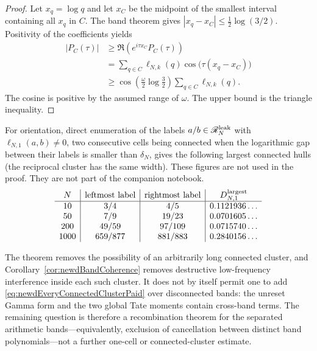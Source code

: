 \documentclass[11pt]{amsart}
\theoremstyle{definition}
\theoremstyle{remark}
\begin{document}
\begin{proof}
Let $x_q=\log q$ and let $x_C$ be the midpoint of the smallest interval
containing all $x_q$ in $C$.  The band theorem gives
$|x_q-x_C|\leq\tfrac12\log(3/2)$.  Positivity of the coefficients yields
\begin{align*}
 |P_C(\tau)|
 &\geq \Re\!\left(e^{i\tau x_C}P_C(\tau)\right)\\
 &=\sum_{q\in C}\ell_{N,k}(q)
       \cos\bigl(\tau(x_q-x_C)\bigr)\\
 &\geq
 \cos\!\left(\frac{\omega}{2}\log\frac32\right)
 \sum_{q\in C}\ell_{N,k}(q).
\end{align*}
The cosine is positive by the assumed range of $\omega$.  The upper bound
is the triangle inequality.
\end{proof}

For orientation, direct enumeration of the labels $a/b\in\mathscr
R_N^{\rm leak}$ with $\ell_{N,1}(a,b)\neq0$, two consecutive cells being
connected when the logarithmic gap between their labels is smaller than
$\delta_N$, gives the following largest connected hulls (the reciprocal
cluster has the same width).  These figures are not used in the proof.  They are not part of the companion notebook.
\[
\begin{array}{c|c|c|c}
N&\text{leftmost label}&\text{rightmost label}&
 D_{N,1}^{\rm largest}\\ \hline
10&3/4&4/5&0.1121936\ldots\\
50&7/9&19/23&0.0701605\ldots\\
200&49/59&97/109&0.0715740\ldots\\
1000&659/877&881/883&0.2840156\ldots
\end{array}
\]

The theorem removes the possibility of an arbitrarily long connected
cluster, and Corollary~\ref{cor:newdBandCoherence} removes destructive
low-frequency interference inside each such cluster.  It does not by
itself permit one to add
\eqref{eq:newdEveryConnectedClusterPaid} over disconnected bands: the
unreset Gamma form and the two global Tate moments contain cross-band
terms.  The remaining question is therefore a recombination theorem for
the separated arithmetic bands---equivalently, exclusion of cancellation
between distinct band polynomials---not a further one-cell or
connected-cluster estimate.
\end{document}
